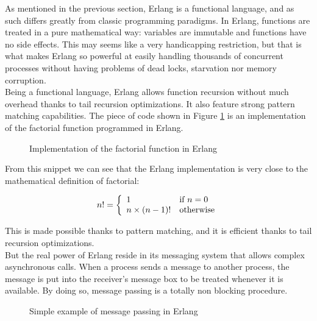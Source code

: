 As mentioned in the previous section, Erlang is a functional language, and as such differs greatly from classic programming paradigms. In Erlang, functions are treated in a pure mathematical way: variables are immutable and functions have no side effects. This may seems like a very handicapping restriction, but that is what makes Erlang so powerful at easily handling thousands of concurrent processes without having problems of dead locks, starvation nor memory corruption.\\

Being a functional language, Erlang allows function recursion without much overhead thanks to tail recursion optimizations. It also feature strong pattern matching capabilities. The piece of code shown in Figure \ref{fig:erlang_factorial} is an implementation of the factorial function programmed in Erlang.\\

\begin{figure}[ht]
  \centering
  \caption{Implementation of the factorial function in Erlang}
  \label{fig:erlang_factorial}
\end{figure}

From this snippet we can see that the Erlang implementation is very close to the mathematical definition of factorial:

 \[n! = 
            \left\{
              \begin{array}{l l}
                   1 & \textrm{if } n = 0\\
                   n \times (n - 1)! & \textrm{otherwise}
               \end{array}
            \right.
\] 

This is made possible thanks to pattern matching, and it is efficient thanks to tail recursion optimizations.\\

But the real power of Erlang reside in its messaging system that allows complex asynchronous calls. When a process sends a message to another process, the message is put into the receiver's message box to be treated whenever it is available. By doing so, message passing is a totally non blocking procedure.\\

\begin{figure}[ht]
  \centering
  \caption{Simple example of message passing in Erlang}
  \label{fig:erlang_message}
\end{figure}

